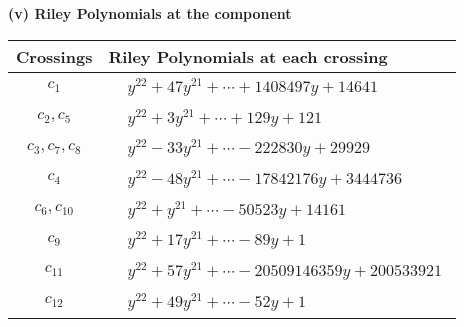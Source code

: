 \documentclass[1p]{elsarticle_modified}
\theoremstyle{definition}
\begin{document}
\newpage\renewcommand{\arraystretch}{1}
\flushleft \textbf{(v) Riley Polynomials at the component}\newline \\
\begin{tabular}{m{50pt}|m{274pt}}
Crossings & \hspace{64pt}Riley Polynomials at each crossing \\
\hline $$\begin{aligned}c_{1}\end{aligned}$$&$\begin{aligned}
&y^{22}+47 y^{21}+\cdots+1408497 y+14641
\end{aligned}$\\
\hline $$\begin{aligned}c_{2},c_{5}\end{aligned}$$&$\begin{aligned}
&y^{22}+3 y^{21}+\cdots+129 y+121
\end{aligned}$\\
\hline $$\begin{aligned}c_{3},c_{7},c_{8}\end{aligned}$$&$\begin{aligned}
&y^{22}-33 y^{21}+\cdots-222830 y+29929
\end{aligned}$\\
\hline $$\begin{aligned}c_{4}\end{aligned}$$&$\begin{aligned}
&y^{22}-48 y^{21}+\cdots-17842176 y+3444736
\end{aligned}$\\
\hline $$\begin{aligned}c_{6},c_{10}\end{aligned}$$&$\begin{aligned}
&y^{22}+y^{21}+\cdots-50523 y+14161
\end{aligned}$\\
\hline $$\begin{aligned}c_{9}\end{aligned}$$&$\begin{aligned}
&y^{22}+17 y^{21}+\cdots-89 y+1
\end{aligned}$\\
\hline $$\begin{aligned}c_{11}\end{aligned}$$&$\begin{aligned}
&y^{22}+57 y^{21}+\cdots-20509146359 y+200533921
\end{aligned}$\\
\hline $$\begin{aligned}c_{12}\end{aligned}$$&$\begin{aligned}
&y^{22}+49 y^{21}+\cdots-52 y+1
\end{aligned}$\\
\hline
\end{tabular}\\~\\
\end{document}
